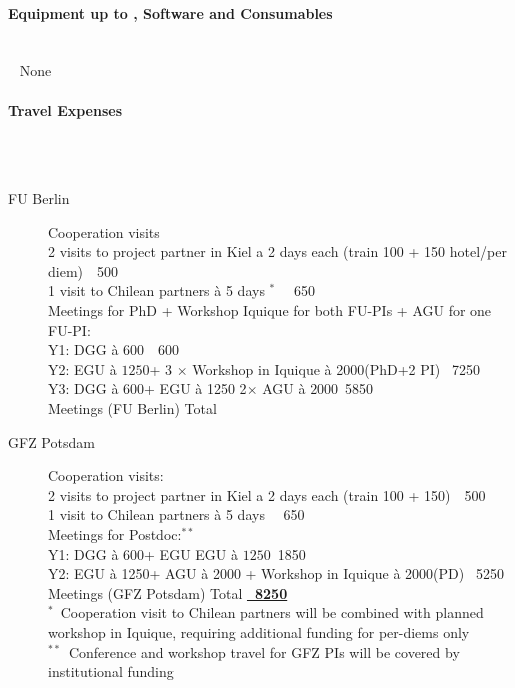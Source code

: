 \documentclass[11pt]{article}
\providecommand{\currfilename}{}
\newcommand{\myparagraph}[1]{\paragraph{#1}\mbox{}\\}
\newcommand{\showfile}{{\bf \tt \color{blue} \currfilename}}
\newcommand{\note}[1]{{\it \color{red} #1}}
\newcommand{\note}[1]{}
\newcommand{\showfile}{}
\begin{document}
\myparagraph{Equipment up to , Software and Consumables}
\showfile
None

\myparagraph{Travel Expenses}
\showfile
\begin{description}
 \item[FU Berlin] 
Cooperation visits\\
2 visits to project partner in Kiel a 2 days each (train 100 + 150 hotel/per diem)\hfill \texteuro\ \ 500  \\
1 visit to Chilean partners \`a 5 days $^\ast$					\hfill \texteuro\ \ 650 \\
Meetings for PhD + Workshop Iquique for both FU-PIs + AGU for one FU-PI: \\
Y1: DGG \`{a} $600$\texteuro 									\mbox{}\hfill\texteuro\ \ 600\\
Y2: EGU \`{a} $1250$\texteuro +  3 $\times$ Workshop in Iquique \`{a} 2000\texteuro (PhD+2 PI)		\mbox{}\hfill\texteuro\  7250\\
Y3: DGG \`{a} 600\texteuro + EGU \`a 1250 2$\times$ AGU \`{a} $2000$\texteuro 				\mbox{}\hfill\texteuro\ 5850\\
Meetings (FU Berlin) Total									\mbox{}\hfill \textbf{\underline{\texteuro 14850}}
 \item[GFZ Potsdam] 
Cooperation visits: \\
2 visits to project partner in Kiel a 2 days each (train 100 + 150)\hfill \texteuro\ \ 500  \\
1 visit to Chilean partners \`a 5 days 					\hfill \texteuro\ \ 650 \\
Meetings for Postdoc:$^{\ast\ast}$ \\
Y1: DGG \`{a} $600$\texteuro + EGU EGU \`{a} $1250$\texteuro 				   \mbox{}\hfill \texteuro\ 1850\\
Y2: EGU \`{a} 1250\texteuro + AGU \`{a} 2000 + Workshop in Iquique \`{a} 2000\texteuro (PD) \mbox{}\hfill\texteuro\ 5250\\
Meetings (GFZ Potsdam) Total								\mbox{}\hfill \textbf{\underline{\texteuro\ 8250}}\\
\footnotesize 
$^\ast$\ Cooperation visit to Chilean partners will be combined with planned workshop in Iquique, requiring additional funding for per-diems only\\
$^{\ast\ast}$\  Conference and workshop travel for GFZ PIs will be covered by institutional funding 
\end{description}
\end{document}
